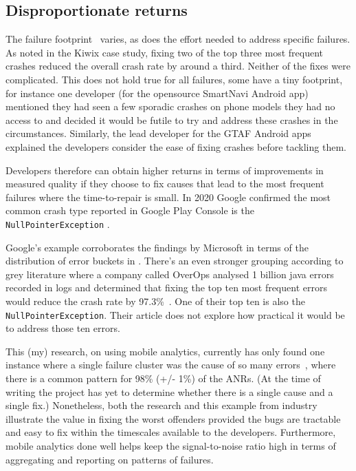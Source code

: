\subsection{Disproportionate returns}
The failure footprint~ varies, as does the effort needed to address specific failures. As noted in the Kiwix case study, fixing two of the top three most frequent crashes reduced the overall crash rate by around a third. Neither of the fixes were complicated. This does not hold true for all failures, some have a tiny footprint, for instance one developer (for the opensource SmartNavi Android app)
mentioned they had seen a few sporadic crashes on phone models they had no access to and decided it would be futile to try and address these crashes in the circumstances. Similarly, the lead developer for the GTAF Android apps explained the developers consider the ease of fixing crashes before tackling them. 

Developers therefore can obtain higher returns in terms of improvements in measured quality if they choose to fix causes that lead to the most frequent failures where the time-to-repair is small. In 2020 Google confirmed the most common crash type reported in Google Play Console is the \texttt{NullPointerException} .  %

Google's example corroborates the findings by Microsoft in terms of the distribution of error buckets in . There's an even stronger grouping according to grey literature where a company called OverOps analysed 1 billion java errors recorded in logs and determined that fixing the top ten most frequent errors would reduce the crash rate by 97.3\%~. One of their top ten is also the \texttt{NullPointerException}. Their article does not explore how practical it would be to address those ten errors. 

This (my) research, on using mobile analytics, currently has only found one instance where a single failure cluster was the cause of so many errors~, where there is a common pattern for 98\% (+/- 1\%) of the ANRs. (At the time of writing the project has yet to determine whether there is a single cause and a single fix.) Nonetheless, both the research and this example from industry illustrate the value in fixing the worst offenders provided the bugs are tractable and easy to fix within the timescales available to the developers. Furthermore, mobile analytics done well helps keep the signal-to-noise ratio high in terms of aggregating and reporting on patterns of failures.


